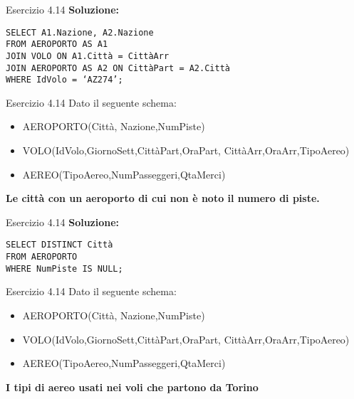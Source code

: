 \begin{frame}{Esercizio 4.14}
    \textbf{Soluzione:}
    \vspace{1em}
    
    \texttt{SELECT A1.Nazione, A2.Nazione\\FROM AEROPORTO AS A1\\ JOIN VOLO ON A1.Citt\`a = Citt\`aArr \\JOIN AEROPORTO AS A2 ON Citt\`aPart = A2.Citt\`a\\WHERE IdVolo = `AZ274';
}
    \end{frame}
\begin{frame}{Esercizio 4.14}
    Dato il seguente schema:
    \begin{itemize}
        \item AEROPORTO(Citt\`a, Nazione,NumPiste)
        \item VOLO(IdVolo,GiornoSett,Citt\`aPart,OraPart,
        Citt\`aArr,OraArr,TipoAereo)
        \item AEREO(TipoAereo,NumPasseggeri,QtaMerci)
    \end{itemize}
    \vspace{1em}
    
    \textbf{Le citt\`a con un aeroporto di cui non \`e noto il numero di piste.}
\end{frame}

\begin{frame}{Esercizio 4.14}
    \textbf{Soluzione:}
    \vspace{1em}
    
    \texttt{SELECT DISTINCT Citt\`a\\FROM AEROPORTO\\WHERE NumPiste IS NULL;}
    \end{frame}
\begin{frame}{Esercizio 4.14}
    Dato il seguente schema:
    \begin{itemize}
        \item AEROPORTO(Citt\`a, Nazione,NumPiste)
        \item VOLO(IdVolo,GiornoSett,Citt\`aPart,OraPart,
        Citt\`aArr,OraArr,TipoAereo)
        \item AEREO(TipoAereo,NumPasseggeri,QtaMerci)
    \end{itemize}
    \vspace{1em}
    
    \textbf{I tipi di aereo usati nei voli che partono da Torino}
\end{frame}

